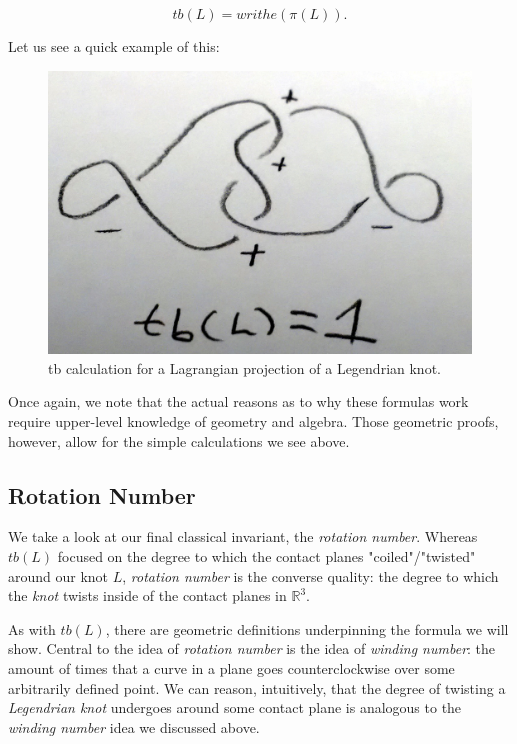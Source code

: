 \documentclass{article}
\begin{document}
\[tb(L) = writhe(\pi(L)).\]

Let us see a quick example of this:

\begin{figure}[h!]
    \includegraphics[width=\linewidth]{tbLagr.jpg}
    \caption{tb calculation for a Lagrangian projection of a Legendrian knot.}
    \label{fig:knot1}
\end{figure}


Once again, we note that the actual reasons as to why these formulas work require
upper-level knowledge of geometry and algebra. Those geometric proofs, however,
allow for the simple calculations we see above.

\subsection{Rotation Number}
We take a look at our final classical invariant, the \textit{rotation number}.
Whereas $tb(L)$ focused on the degree to which the contact planes "coiled"/"twisted"
around our knot $L$, \textit{rotation number} is the converse quality: the degree
to which the \textit{knot} twists inside of the contact planes in $\mathbb{R}^3$.

As with $tb(L)$, there are geometric definitions underpinning the formula we will
show. Central to the idea of \textit{rotation number} is the idea of \textit{winding number}:
the amount of times that a curve in a plane goes counterclockwise over some arbitrarily defined
point. We can reason, intuitively, that the degree of twisting a \textit{Legendrian knot} undergoes
around some contact plane is analogous to the \textit{winding number} idea we discussed above.
\end{document}
